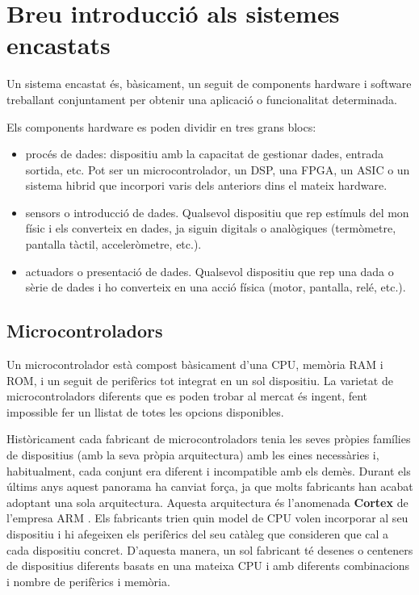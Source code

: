 
\chapter{Breu introducció als sistemes encastats}
\label{ch:components}

Un sistema encastat és, bàsicament, un seguit de components hardware i software treballant conjuntament per obtenir una aplicació o funcionalitat determinada.

Els components hardware es poden dividir en tres grans blocs:
\begin{itemize}
\item procés de dades: dispositiu amb la capacitat de gestionar dades, entrada sortida, etc. Pot ser un microcontrolador, un \gls{DSP}, una \gls{FPGA}, un \gls{ASIC} o un sistema hibrid que incorpori varis dels anteriors dins el mateix hardware.
 \item sensors o introducció de dades. Qualsevol dispositiu que rep estímuls del mon físic i els converteix en dades, ja siguin digitals o analògiques (termòmetre, pantalla tàctil, acceleròmetre, etc.).
 \item actuadors o presentació de dades. Qualsevol dispositiu que rep una dada o sèrie de dades i ho converteix en una acció física (motor, pantalla, relé, etc.).
\end{itemize}


\section{Microcontroladors}
Un microcontrolador està compost bàsicament d'una \gls{CPU}, memòria \gls{RAM} i \gls{ROM}, i un seguit de perifèrics tot integrat en un sol dispositiu. La varietat de microcontroladors diferents que es poden trobar al mercat és ingent, fent impossible fer un llistat de totes les opcions disponibles.

Històricament cada fabricant de microcontroladors tenia les seves pròpies famílies de dispositius (amb la seva pròpia arquitectura) amb les eines necessàries i, habitualment, cada conjunt era diferent i incompatible amb els demès.
Durant els últims anys aquest panorama ha canviat força, ja que molts fabricants han acabat adoptant una sola arquitectura. Aquesta arquitectura és l'anomenada {\bf \gls{Cortex}} de l'empresa \gls{ARM} \cite{Cortex}. Els fabricants trien quin model de CPU volen incorporar al seu dispositiu i hi afegeixen els perifèrics del seu catàleg que consideren que cal a cada dispositiu concret. D'aquesta manera, un sol fabricant té desenes o centeners de dispositius diferents basats en una mateixa CPU i amb diferents combinacions i nombre de perifèrics i memòria.

